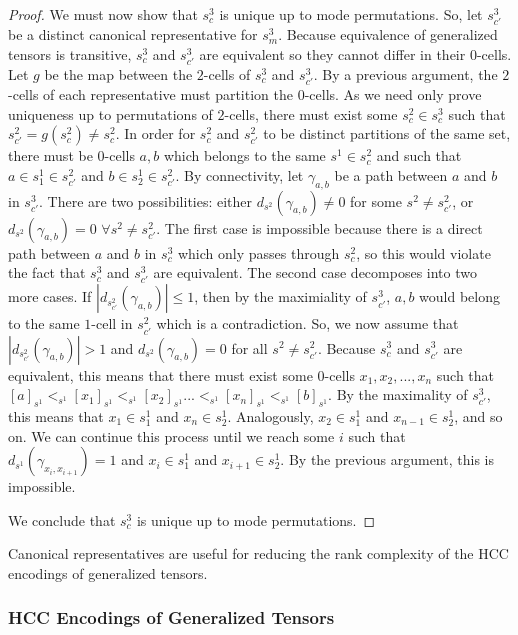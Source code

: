 \documentclass{article}
\theoremstyle{plain}
\theoremstyle{definition}
\theoremstyle{remark}
\begin{document}
\begin{proof}
	We must now show that $s^3_c$ is unique up to mode permutations. So, let $s^3_{c'}$ be a distinct canonical representative for $s^3_m$. Because equivalence of generalized tensors is transitive, $s^3_c$ and $s^3_{c'}$ are equivalent so they cannot differ in their $0$-cells. Let $g$ be the map between the $2$-cells of $s^3_c$ and $s^3_{c'}$. By a previous argument, the $2$-cells of each representative must partition the $0$-cells. As we need only prove uniqueness up to permutations of $2$-cells, there must exist some $s^2_c \in s^3_c$ such that $s^2_{c'} = g(s^2_c) \neq s^2_c$. In order for $s^2_c$ and $s^2_{c'}$ to be distinct partitions of the same set, there must be $0$-cells $a, b$ which belongs to the same $s^1 \in s^2_c$ and such that $a \in s^1_1 \in s^2_{c'}$ and $b \in s^1_2 \in s^2_{c'}$. By connectivity, let $\gamma_{a, b}$ be a path between $a$ and $b$ in $s^3_{c'}$. There are two possibilities: either $d_{s^2}(\gamma_{a, b}) \neq 0$ for some $s^2 \neq s^2_{c'}$, or $d_{s^2}(\gamma_{a, b}) = 0$ $\forall s^2 \neq s^2_{c'}$. The first case is impossible because there is a direct path between $a$ and $b$ in $s^3_c$ which only passes through $s^2_c$, so this would violate the fact that $s^3_c$ and $s^3_{c'}$ are equivalent. The second case decomposes into two more cases. If $|d_{s^2_{c'}}(\gamma_{a, b})| \leq 1$, then by the maximiality of $s^3_{c'}$, $a, b$ would belong to the same $1$-cell in $s^2_{c'}$ which is a contradiction. So, we now assume that $|d_{s^2_{c'}}(\gamma_{a, b})| > 1$ and $d_{s^2}(\gamma_{a, b}) = 0$ for all $s^2 \neq s^2_{c'}$. Because $s^3_c$ and $s^3_{c'}$ are equivalent, this means that there must exist some $0$-cells $x_1, x_2, ..., x_n$ such that $[a]_{s^1} <_{s^1} [x_1]_{s^1} <_{s^1} [x_2]_{s^1} ... <_{s^1} [x_n]_{s^1} <_{s^1} [b]_{s^1}$. By the maximality of $s^3_{c'}$, this means that $x_1 \in s^1_1$ and $x_n \in s^1_2$. Analogously, $x_2 \in s^1_1$ and $x_{n-1} \in s^1_2$, and so on. We can continue this process until we reach some $i$ such that $d_{s^1}(\gamma_{x_i, x_{i+1}}) = 1$ and $x_i \in s^1_1$ and $x_{i+1} \in s^1_2$. By the previous argument, this is impossible.
	
	We conclude that $s^3_c$ is unique up to mode permutations.
\end{proof}

Canonical representatives are useful for reducing the rank complexity of the HCC encodings of generalized tensors.

\subsubsection{\label{sec:GenTenHCCs_Apdx}HCC Encodings of Generalized Tensors\label{sec:EncodingGenTensors}}
\end{document}
